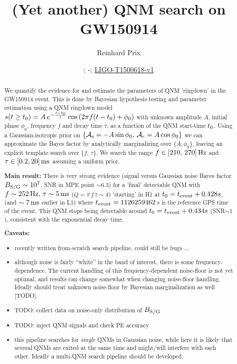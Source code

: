 \documentclass[aps,prd,onecolumn,notitlepage,nofootinbib,superscriptaddress,altaffilletter,floatfix]{revtex4-1}
\newcommand{\dcc}{LIGO-T1500618-v1}
\begin{document}
\title{(Yet another) QNM search on GW150914}


\author{Reinhard Prix}
\date{\commitDATE; \commitIDshort-\commitSTATUS; \href{https://dcc.ligo.org/LIGO-T1500618}{\dcc}}


\begin{abstract}
  We quantify the evidence for and estimate the parameters of QNM 'ringdown' in the GW150914 event.
  This is done by Bayesian hypothesis testing and parameter estimation using a QNM ringdown model
  $s(t\ge t_0) = A\,e^{-\frac{t-t_0}{\tau}}\cos\left(2\pi f (t-t_0) + \phi_0\right)$ with unknown amplitude $A$, initial phase $\phi_0$,
  frequency $f$ and decay time $\tau$, as a function of the QNM start-time $t_0$.
  Using a Gaussian-isotropic prior on $\{\mathcal{A}_{\mathrm{s}}=-A\sin\phi_0,\,\mathcal{A}_{\mathrm{c}}=A\cos\phi_0\}$ we can approximate the Bayes factor by analytically marginalizing over
  $\{A,\phi_0\}$, leaving an explicit template search over $\{f,\,\tau\}$. We search the range $f\in[210,\,270]\,\mathrm{Hz}$ and $\tau \in [0.2, 20]\,\mathrm{ms}$
  assuming a uniform prior.

  \textbf{Main result:}
  There is very strong evidence (signal versus Gaussian noise Bayes factor $B_{\mathrm{S/G}}\sim10^{7}$, SNR in MPE point $\sim6.3$) for a 'final' detectable QNM
  with $f\sim252\,\mathrm{Hz},\,\tau\sim5\,\mathrm{ms}$ ($Q = \pi\,f\,\tau \sim 4$) 'starting' in H1 at $t_0 = t_{\mathrm{event}} + 0.428s$, (and $\sim7\,\mathrm{ms}$ earlier in L1)
  where $t_{\mathrm{event}} = 1126259462\,$s is the reference GPS time of the event.
  This QNM stops being detectable around $t_0 = t_{\mathrm{event}}+0.434s$ (SNR$\sim1$), consistent with the exponential decay time.

  \textbf{Caveats:}
  \begin{itemize}
  \item recently written from-scratch search pipeline, could still be bugs ...
  \item although noise is fairly ``white'' in the band of interest, there is some frequency-dependence. The current handling of this
    frequency-dependent noise-floor is not yet optimal, and results can change somewhat when changing noise-floor handling.
    Ideally should treat unknown noise-floor by Bayesian marginalization as well [TODO].
  \item TODO: collect data on noise-only distribution of $B_{\mathrm{S/G}}$
  \item TODO: inject QNM signals and check PE accuracy
  \item this pipeline searches for \emph{single} QNMs in Gaussian noise, while here it is likely that several QNMs are exited at the same time and
    might/will interfere with each other. Ideally a multi-QNM search pipeline should be developed.
  \end{itemize}
\end{abstract}
\end{document}
